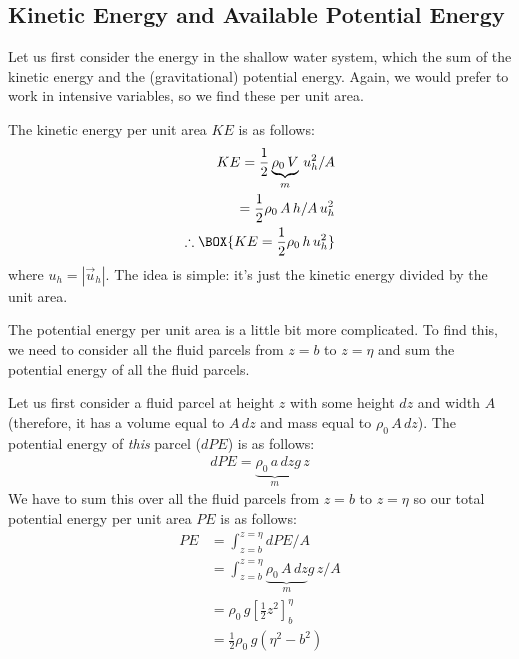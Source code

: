 \subsection{Kinetic Energy and Available Potential Energy}

Let us first consider the energy in the shallow water system, which the sum of the kinetic energy and the (gravitational) potential energy. Again, we would prefer to work in intensive variables, so we find these per unit area.

The kinetic energy per unit area $KE$ is as follows:
\begin{align*}
    KE = \frac{1}{2}\underbrace{\rho_0\,V}_{m}\,u_h^2/A\\
    =\frac{1}{2}\rho_0\,A\,h/A\,u_h^2\\
    \therefore\BOX{KE = \frac{1}{2}\rho_0\,h\,u_h^2}
\end{align*}
where $u_h=|\vec{u}_h|$. The idea is simple: it's just the kinetic energy divided by the unit area.

The potential energy per unit area is a little bit more complicated. To find this, we need to consider all the fluid parcels from $z=b$ to $z=\eta$ and sum the potential energy of all the fluid parcels.

Let us first consider a fluid parcel at height $z$ with some height $dz$ and width $A$ (therefore, it has a volume equal to $A\,dz$ and mass equal to $\rho_0\,A\,dz$). The potential energy of \textit{this} parcel ($dPE$) is as follows:
\begin{align*}
    dPE=\underbrace{\rho_0\,a\,dz}_{m}g\,z
\end{align*}
We have to sum this over all the fluid parcels from $z=b$ to $z=\eta$ so our total potential energy per unit area $PE$ is as follows:
\begin{align*}
    PE &= \int_{z=b}^{z=\eta}dPE/A\\
    &= \int_{z=b}^{z=\eta}\underbrace{\rho_0\,A\,dz}_{m}g\,z/A\\
    &= \rho_0\,g\left[ \frac{1}{2}z^2 \right]_b^\eta\\
    &= \frac{1}{2}\rho_0\,g\left( \eta^2-b^2 \right)
\end{align*}

